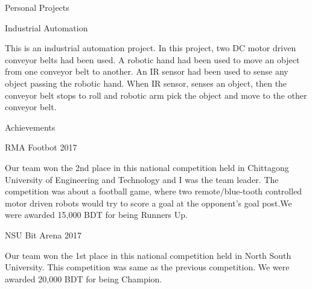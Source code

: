 \documentclass{article}
\newlength{\tabin}
\newlength{\secsep}
\newcommand{\lineunder}{\vspace*{-8pt} \\ \hspace*{-6pt} \hrulefill \\ \vspace*{-15pt}}
\newenvironment{tabbedsection}[1]{
  \begin{list}{}{
      \setlength{\itemsep}{0pt}
      \setlength{\labelsep}{0pt}
      \setlength{\labelwidth}{0pt}
      \setlength{\leftmargin}{\tabin}
      \setlength{\rightmargin}{\tabin}
      \setlength{\listparindent}{0pt}
      \setlength{\parsep}{0pt}
      \setlength{\parskip}{0pt}
      \setlength{\partopsep}{0pt}
      \setlength{\topsep}{#1}
    }
  \item[]
}{\end{list}}
\newenvironment{resume_section}[1]{
  \filbreak
  \vspace{2\secsep}
  \textsc{\large#1}
  \lineunder
  \begin{tabbedsection}{\secsep}
}{\end{tabbedsection}}
\newenvironment{resume_subsection}[2][]{
  \textbf{#2} \hfill {\footnotesize #1} \hspace{2em}
  \begin{tabbedsection}{0.5\secsep}
}{\end{tabbedsection}}
\newenvironment{subitems}{
  \renewcommand{\labelitemi}{-}
  \begin{itemize}
      \setlength{\labelsep}{1em}
}{\end{itemize}}
\begin{document}
\begin{resume_section}{Personal Projects}
  \begin{resume_subsection}[(May 2017)]{Industrial Automation}
    \begin{subitems}
      This is an industrial automation project. In this project, two DC motor driven conveyor belts had been used. A robotic hand had been used to move an object from one conveyor belt to another. An IR sensor had been used to sense any object passing the robotic hand. When IR sensor, senses an object, then the conveyor belt stops to roll and robotic arm pick the object and move to the other conveyor belt.
    \end{subitems}
  \end{resume_subsection}
\end{resume_section}%




\begin{resume_section}{Achievements}
  \begin{resume_subsection}[(May 2017)]{RMA Footbot 2017}
    \begin{subitems}
      Our team won the 2nd place in this national competition held in Chittagong University of Engineering and Technology and I was the team leader. The competition was about a football game, where two remote/blue-tooth controlled motor driven robots would try to score a goal at the opponent's goal post.We were awarded 15,000 BDT for being Runners Up.
    \end{subitems}
  \end{resume_subsection}
  
  \begin{resume_subsection}[(August 2017)]{NSU Bit Arena 2017}
    \begin{subitems}
      Our team won the 1st place in this national competition held in North South University. This competition was same as the previous competition. We were awarded 20,000 BDT for being Champion.
    \end{subitems}
  \end{resume_subsection}
\end{resume_section}%



\end{document}

